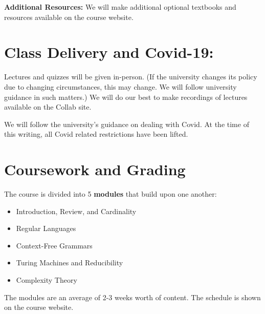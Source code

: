 \documentclass[12pt]{article}
\begin{document}
\textbf{Additional Resources:} We will make additional optional textbooks and resources available on the course website.

\section*{Class Delivery and Covid-19:}

Lectures and quizzes will be given in-person.  (If the university changes its policy due to changing circumstances, this may change. We will follow university guidance in such matters.) We will do our best to make recordings of lectures available on the Collab site.

We will follow the university's guidance on dealing with Covid. At the time of this writing, all Covid related restrictions have been lifted.



\section*{Coursework and Grading}

The course is divided into 5 {\bf modules} that build upon one another:
\begin{itemize}
    \item Introduction, Review, and Cardinality
    \item Regular Languages
    \item Context-Free Grammars
    \item Turing Machines and Reducibility
    \item Complexity Theory
\end{itemize}
The modules are an average of 2-3 weeks worth of content. The schedule is shown on the course website. 
\end{document}
